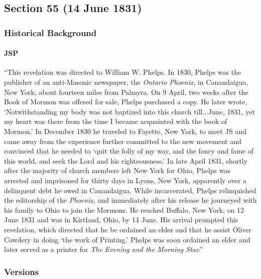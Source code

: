 \subsection{Section 55 (14 June 1831)}
	\label{DC55}
	
	\subsubsection{Historical Background}
		\label{DC55-HB}
		
		\paragraph{JSP}
		
			``This revelation was directed to William W. Phelps. In 1830, Phelps was the publisher of an anti-Masonic newspaper, the \textit{Ontario Phoenix}, in Canandaigua, New York, about fourteen miles from Palmyra. On 9 April, two weeks after the Book of Mormon was offered for sale, Phelps purchased a copy. He later wrote, `Notwithstanding my body was not baptized into this church till...June, 1831, yet my heart was there from the time I became acquainted with the book of Mormon.' In December 1830 he traveled to Fayette, New York, to meet JS and came away from the experience further committed to the new movement and convinced that he needed to `quit the folly of my way, and the fancy and fame of this world, and seek the Lord and his righteousness.' In late April 1831, shortly after the majority of church members left New York for Ohio, Phelps was arrested and imprisoned for thirty days in Lyons, New York, apparently over a delinquent debt he owed in Canandaigua. While incarcerated, Phelps relinquished the editorship of the \textit{Phoenix}, and immediately after his release he journeyed with his family to Ohio to join the Mormons. He reached Buffalo, New York, on 12 June 1831 and was in Kirtland, Ohio, by 14 June. His arrival prompted this revelation, which directed that he be ordained an elder and that he assist Oliver Cowdery in doing `the work of Printing.' Phelps was soon ordained an elder and later served as a printer for \textit{The Evening and the Morning Star}.''
		
	\subsubsection{Versions}
		\label{DC55-V}
		
